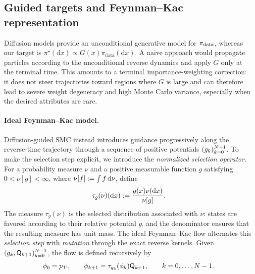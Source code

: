 \documentclass[11pt]{article}
\theoremstyle{plain}
\theoremstyle{definition}
\theoremstyle{remark}
\begin{document}


\subsection{Guided targets and Feynman--Kac representation}
\label{sec:conditional_target}

Diffusion models provide an unconditional generative model for $\pi_{\mathrm{data}}$, whereas our target is $\pi^\star(\mathrm dx) \propto G(x)\pi_{\mathrm{data}}(\mathrm dx)$. A naive approach would propagate particles according to the unconditional reverse dynamics and apply $G$ only at the terminal time. This amounts to a terminal importance-weighting correction: it does not steer trajectories toward regions where $G$ is large and can therefore lead to severe weight degeneracy and high Monte Carlo variance, especially when the desired attributes are rare.

\paragraph{Ideal Feynman--Kac model.} Diffusion-guided SMC instead introduces guidance progressively along the reverse-time trajectory through a sequence of positive potentials $(\pot{k})_{k=0}^{N-1}$.
To make the selection step explicit, we introduce the \emph{normalized
selection operator}. For a probability measure $\nu$ and a positive
measurable function $g$ satisfying $0<\nu[g]<\infty$, where
$\nu[f]:=\int f\,\mathrm{d}\nu$, define
\[
\tau_g(\nu)(\mathrm{d} x)
:=
\frac{g(x)\nu(\mathrm{d} x)}{\nu[g]}.
\]
The measure $\tau_g(\nu)$ is the selected distribution associated with
$\nu$: states are favored according to their relative potential $g$,
and the denominator ensures that the resulting measure has unit mass.
The ideal Feynman--Kac flow alternates this \textit{selection step }with \textit{mutation} through the exact reverse kernels. Given
$(\pot{k},\mk{k+1})_{k=0}^{N-1}$, the flow is defined recursively by
\begin{equation}
\label{eq:ideal_guided_flow}
\filter{0}=p_T,
\qquad
\filter{k+1}
=\tau_{\pot{k}}(\filter{k})\mk{k+1},
\qquad k=0,\ldots,N-1.
\end{equation}
\end{document}
